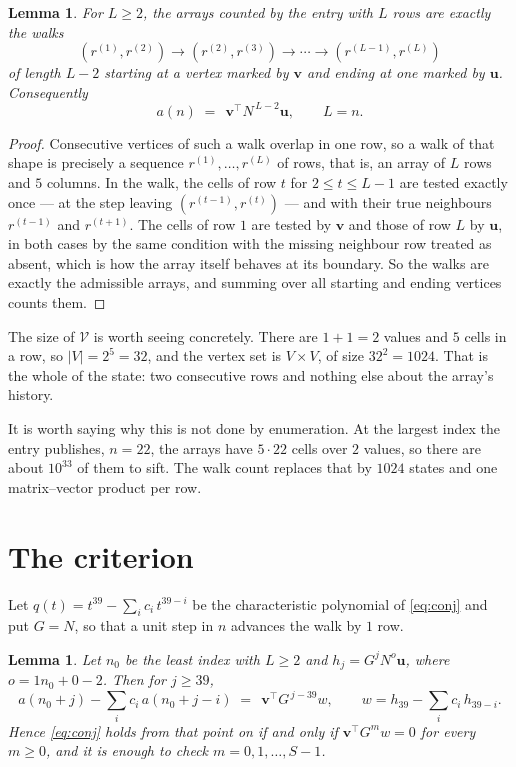 \documentclass[11pt,a4paper]{article}
\theoremstyle{plain}
\newtheorem{lemma}[theorem]{Lemma}
\theoremstyle{definition}
\begin{document}
\begin{lemma}\label{lem:walk}
For $L\ge2$, the arrays counted by the entry with $L$ rows are exactly the walks
\[
(r^{(1)},r^{(2)})\to(r^{(2)},r^{(3)})\to\cdots\to(r^{(L-1)},r^{(L)})
\]
of length $L-2$ starting at a vertex marked by $\mathbf{v}$ and ending at one marked by
$\mathbf{u}$. Consequently
\[
a(n)\;=\;\,\mathbf{v}^{\!\top}N^{\,L-2}\mathbf{u},\qquad L=n .
\]
\end{lemma}

\begin{proof}
Consecutive vertices of such a walk overlap in one row, so a walk of that shape is
precisely a sequence $r^{(1)},\dots,r^{(L)}$ of rows, that is, an array of $L$ rows
and $5$ columns. In the walk, the cells of row $t$ for $2\le t\le L-1$ are tested
exactly once --- at the step leaving $(r^{(t-1)},r^{(t)})$ --- and with their true
neighbours $r^{(t-1)}$ and $r^{(t+1)}$. The cells of row $1$ are tested by
$\mathbf{v}$ and those of row $L$ by $\mathbf{u}$, in both cases by the same condition
with the missing neighbour row treated as absent, which is how the array itself behaves at
its boundary. So the walks are exactly the admissible arrays, and summing over all starting
and ending vertices counts them.
\end{proof}


The size of $\mathcal V$ is worth seeing concretely. There are $1+1=2$ values
and $5$ cells in a row, so $|V|=2^{5}=32$, and the vertex set is
$V\times V$, of size $32^2=1024$. That is the whole of the state: two consecutive
rows and nothing else about the array's history.

It is worth saying why this is not done by enumeration. At the largest index the entry
publishes, $n=22$, the arrays have $5\cdot22$ cells over
$2$ values, so there are about $10^{33}$ of them to sift. The
walk count replaces that by $1024$ states and one matrix--vector product per row.
\section{The criterion}

Let $q(t)=t^{39}-\sum_i c_i\,t^{39-i}$ be the characteristic polynomial of
\eqref{eq:conj} and put $G=N$, so that a unit step in $n$ advances the walk by
$1$ row.

\begin{lemma}\label{lem:crit}
Let $n_0$ be the least index with $L\ge2$ and $h_j=G^{j}N^{o}\mathbf{u}$, where
$o=1n_0+0-2$. Then for $j\ge39$,
\[
a(n_0+j)-\sum_i c_i\,a(n_0+j-i)\;=\;\,\mathbf{v}^{\!\top}G^{\,j-39}w,
\qquad w=h_{39}-\sum_i c_i\,h_{39-i} .
\]
Hence \eqref{eq:conj} holds from that point on if and only if
$\mathbf{v}^{\!\top}G^{m}w=0$ for every $m\ge0$, and it is enough to check
$m=0,1,\dots,S-1$.
\end{lemma}
\end{document}
